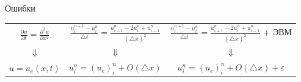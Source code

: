 \documentclass[10pt,xcolor=pst,aspectratio=169]{beamer}
\begin{document}
%
%
%
%
%
%

\begin{frame}{Ошибки}

    \transdissolve[duration=0.1]
    \justifying
    \large

    \begin{center}
        \begin{tabular}{|c|c|c|}
            $\frac{\partial u}{\partial t} = \frac{\partial^{2} u}{\partial x^{2}}$
            &
            $\frac{u^{n + 1}_{i} - u^{n}_{i}}{\triangle t} = \frac{u^{n}_{i + 1} - 2 u^{n}_{i} + u^{n}_{i - 1}}{\left(\triangle x\right)^{2}}$
            &
            $\frac{u^{n + 1}_{i} - u^{n}_{i}}{\triangle t} = \frac{u^{n}_{i + 1} - 2 u^{n}_{i} + u^{n}_{i - 1}}{\left(\triangle x\right)^{2}}$ + ЭВМ
            \\
            $\Downarrow$ & $\Downarrow$ & $\Downarrow$ \\
            $u = u_{e} \left( x, t\right)$ & $u^{n}_{i} = \left( u_{e} \right)^{n}_{i} + \mathit{O} \left( \triangle x \right)$ & $u^{n}_{i} = \left( u_{e} \right)^{n}_{i} + \mathit{O} \left( \triangle x \right) + \varepsilon$ \\
        \end{tabular}
    \end{center}

\end{frame}
\end{document}
